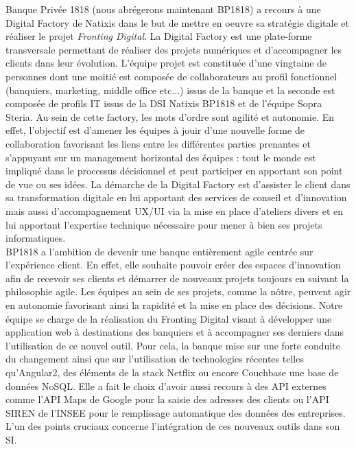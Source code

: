 	Banque Privée 1818 (nous abrégerons maintenant BP1818) a recours à une Digital Factory de Natixis dans le but de mettre en oeuvre sa stratégie digitale et réaliser le projet \textit{Fronting Digital}. La Digital Factory est une plate-forme transversale permettant de réaliser des projets numériques et d'accompagner les clients dans leur évolution. L'équipe projet est constituée d'une vingtaine de personnes dont une moitié est composée de collaborateurs au profil fonctionnel (banquiers, marketing, middle office etc...) issus de la banque et la seconde est composée de profils IT issus de la DSI Natixis BP1818 et de l'équipe Sopra Steria. Au sein de cette factory, les mots d'ordre sont agilité et autonomie. En effet, l'objectif est d'amener les équipes à jouir d'une nouvelle forme de collaboration favorisant les liens entre les différentes parties prenantes et s'appuyant sur un management horizontal des équipes : tout le monde est impliqué dans le processus décisionnel et peut participer en apportant son point de vue ou ses idées. La démarche de la Digital Factory est d'assister le client dans sa transformation digitale en lui apportant des services de conseil et d'innovation mais aussi d'accompagnement UX/UI via la mise en place d'ateliers divers et en lui apportant l'expertise technique nécessaire pour mener à bien ses projets informatiques. \\
	
	BP1818 a l'ambition de devenir une banque entièrement agile centrée sur l'expérience client. En effet, elle souhaite pouvoir créer des espaces d'innovation afin de recevoir ses clients et démarrer de nouveaux projets toujours en suivant la philosophie agile. Les équipes au sein de ses projets, comme la nôtre, peuvent agir en autonomie favorisant ainsi la rapidité et la mise en place des décisions. Notre équipe se charge de la réalisation du Fronting Digital visant à développer une application web à destinations des banquiers et à accompagner ses derniers dans l'utilisation de ce nouvel outil. Pour cela, la banque mise sur une forte conduite du changement ainsi que sur l'utilisation de technologies récentes telles qu'Angular2, des éléments de la stack Netflix ou encore Couchbase une base de données NoSQL. Elle a fait le choix d'avoir aussi recours à des API externes comme l'API Maps de Google pour la saisie des adresses des clients ou l'API SIREN de l'INSEE pour le remplissage automatique des données des entreprises. L'un des points cruciaux concerne l'intégration de ces nouveaux outils dans son SI. \\
	
